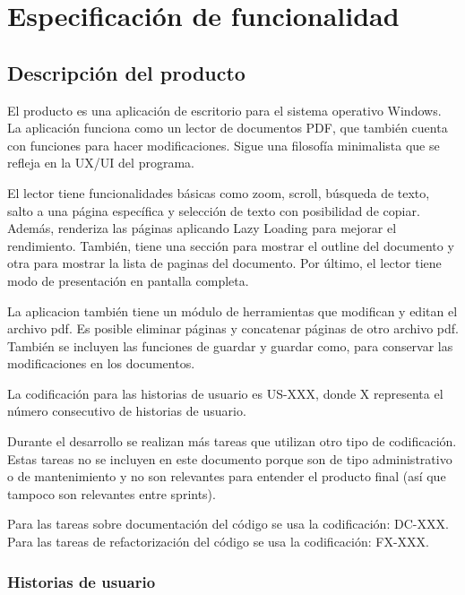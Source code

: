 \chapter{Especificación de funcionalidad}
\section{Descripción del producto}

El producto es una aplicación de escritorio para el sistema operativo Windows. La aplicación funciona como un lector de documentos PDF, que también cuenta con funciones para hacer modificaciones. Sigue una filosofía minimalista que se refleja en la UX/UI del programa.

El lector tiene funcionalidades básicas como zoom, scroll, búsqueda de texto, salto a una página específica y selección de texto con posibilidad de copiar. Además, renderiza las páginas aplicando Lazy Loading para mejorar el rendimiento. También, tiene una sección para mostrar el outline del documento y otra para mostrar la lista de paginas del documento. Por último, el lector tiene modo de presentación en pantalla completa.

La aplicacion también tiene un módulo de herramientas que modifican y editan el archivo pdf. Es posible eliminar páginas y concatenar páginas de otro archivo pdf. También se incluyen las funciones de guardar y guardar como, para conservar las modificaciones en los documentos.

La codificación para las historias de usuario es US-XXX, donde X representa el número consecutivo de historias de usuario. 

Durante el desarrollo se realizan más tareas que utilizan otro tipo de codificación. Estas tareas no se incluyen en este documento porque son de tipo  administrativo o de mantenimiento y no son relevantes para entender el producto final (así que tampoco son relevantes entre sprints).

Para las tareas sobre documentación del código se usa la codificación: DC-XXX. Para las tareas de refactorización del código se usa la codificación: FX-XXX. 

\subsection{Historias de usuario}


